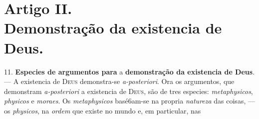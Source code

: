 
\section*{Artigo II.\\ Demonstração da existencia de Deus.}

11. \textbf{Especies de argumentos para} a \textbf{demonstração da existencia de Deus}. --- A existencia de \textsc{Deus} demonstra-se \emph{a-posteriori}. Ora os argumentos, que demonstram \emph{a-posteriori} a existencia de   \textsc{Deus}, são de tres especies: \emph{metaphysicos}, \emph{physicos} e \emph{moraes}. Os \emph{metaphysicos} basé6am-se na propria \emph{natureza} das coisas, --- os \emph{physicos}, na \emph{ordem} que existe no mundo e, em particular, nas 
